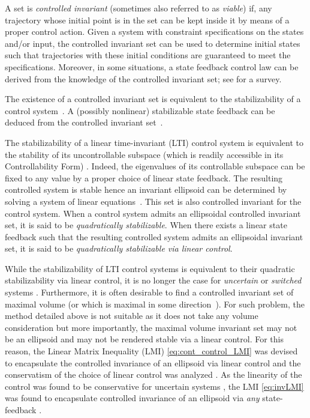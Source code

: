 \documentclass[11pt,twoside,a4paper,openright]{uclouvain-thesis}
\begin{document}
A set is \emph{controlled invariant} (sometimes also referred to as \emph{viable})
if, any trajectory whose initial point is in the set can be kept inside it by means of a proper control action.
Given a system with constraint specifications on the states and/or input, the controlled invariant set can be used
to determine initial states such that trajectories with these initial conditions are guaranteed to meet the specifications.
Moreover, in some situations, a state feedback control law can be derived from the knowledge of the controlled invariant set; see \cite{blanchini1999survey} for a survey.

The existence of a controlled invariant set is equivalent to the stabilizability of a control system~\cite{sontag1983lyapunov}.
A (possibly nonlinear) stabilizable state feedback can be deduced from the controlled invariant set~\cite{barmish1985necessary}.

The stabilizability of a linear time-invariant (LTI) control system is equivalent
to the stability of its uncontrollable subspace (which is readily accessible
in its Controllability Form) \cite[Section~2.4]{wonham1974linear}.
Indeed, the eigenvalues of its controllable subspace can be fixed to any value
by a proper choice of linear state feedback.
The resulting controlled system is stable hence an invariant ellipsoid can be
determined by solving a system of linear equations~\cite{Liapounoff1907}.
This set is also controlled invariant for the control system.
When a control system admits an ellipsoidal controlled invariant set,
it is said to be \emph{quadratically stabilizable}.
When there exists a linear state feedback such that the resulting controlled
system admits an ellipsoidal invariant set, it is said to be
\emph{quadratically stabilizable via linear control}.

While the stabilizability of LTI control systems is equivalent to their
quadratic stabilizability via linear control,
it is no longer the case for \emph{uncertain} or \emph{switched} systems \cite{petersen1985quadratic}.
Furthermore, it is often desirable to find a controlled invariant set of maximal
volume (or which is maximal in some direction~\cite{ahmadi2018robust}).
For such problem, the method detailed above is not suitable as it does not
take any volume consideration but more importantly, the maximal volume
invariant set may not be an ellipsoid and may not be rendered stable via
a linear control.
For this reason, the Linear Matrix Inequality (LMI) \eqref{eq:cont_control_LMI} was devised to encapsulate the
controlled invariance of an ellipsoid via linear control \cite[Section~7.2.2]{boyd1994linear}
and the conservatism of the choice of linear control was analyzed \cite{sontag1983lyapunov}.
As the linearity of the control was found to be conservative for uncertain systems \cite{petersen1985quadratic},
the LMI \eqref{eq:invLMI} was found to encapsulate controlled invariance of an ellipsoid
via \emph{any} state-feedback \cite{barmish1985necessary}.
\end{document}
